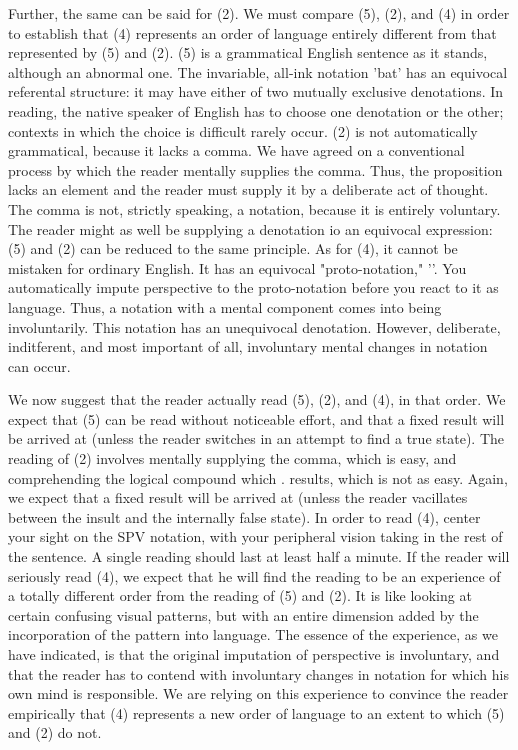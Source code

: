 Further, the same can be said for (2). We must compare (5), (2), and (4) in 
order to establish that (4) represents an order of language entirely different 
from that represented by (5) and (2). (5) is a grammatical English sentence 
as it stands, although an abnormal one. The invariable, all-ink notation 'bat' 
has an equivocal referental structure: it may have either of two mutually 
exclusive denotations. In reading, the native speaker of English has to choose 
one denotation or the other; contexts in which the choice is difficult rarely 
occur. (2) is not automatically grammatical, because it lacks a comma. We 
have agreed on a conventional process by which the reader mentally supplies 
the comma. Thus, the proposition lacks an element and the reader must 
supply it by a deliberate act of thought. The comma is not, strictly speaking, 
a notation, because it is entirely voluntary. The reader might as well be 
supplying a denotation io an equivocal expression: (5) and (2) can be 
reduced to the same principle. As for (4), it cannot be mistaken for ordinary 
English. It has an equivocal "proto-notation," '\cubeframe'. You automatically 
impute perspective to the proto-notation before you react to it as language. 
Thus, a notation with a mental component comes into being involuntarily. 
This notation has an unequivocal denotation. However, deliberate, 
inditferent, and most important of all, involuntary mental changes in 
notation can occur. 

We now suggest that the reader actually read (5), (2), and (4), in that 
order. We expect that (5) can be read without noticeable effort, and that a 
fixed result will be arrived at (unless the reader switches in an attempt to 
find a true state). The reading of (2) involves mentally supplying the comma, 
which is easy, and comprehending the logical compound which . results, 
which is not as easy. Again, we expect that a fixed result will be arrived at 
(unless the reader vacillates between the insult and the internally false state). 
In order to read (4), center your sight on the SPV notation, with your 
peripheral vision taking in the rest of the sentence. A single reading should 
last at least half a minute. If the reader will seriously read (4), we expect that 
he will find the reading to be an experience of a totally different order from 
the reading of (5) and (2). It is like looking at certain confusing visual 
patterns, but with an entire dimension added by the incorporation of the 
pattern into language. The essence of the experience, as we have indicated, is 
that the original imputation of perspective is involuntary, and that the reader 
has to contend with involuntary changes in notation for which his own mind 
is responsible. We are relying on this experience to convince the reader 
empirically that (4) represents a new order of language to an extent to which 
(5) and (2) do not. 

